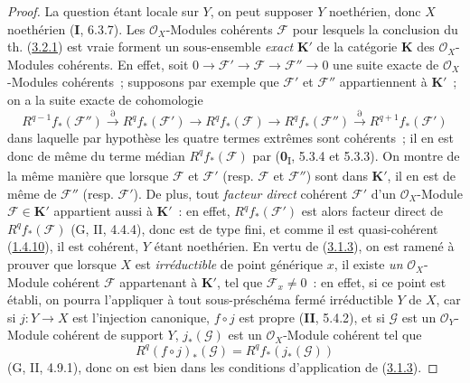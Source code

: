 \begin{proof}
La question étant locale sur $Y$, on peut supposer $Y$ noethérien, donc $X$
noethérien (\textbf{I}, 6.3.7). Les $\mathcal O_X$-Modules cohérents $\mathcal F$ pour
lesquels la conclusion du th. (\hyperref[III.3.2.1-fr]{3.2.1}) est vraie
forment un sous-ensemble \emph{exact} $\boldsymbol{K}'$ de la catégorie $\boldsymbol{K}$ des
$\mathcal O_X$-Modules cohérents.
En effet, soit
$0\to\mathcal F'\to\mathcal F\to\mathcal F''\to0$ une suite exacte de
$\mathcal O_X$-Modules cohérents~; supposons par exemple que $\mathcal F'$
et $\mathcal F''$ appartiennent à $\boldsymbol{K}'$~; on a la suite exacte de cohomologie
\[
R^{q-1}f_*(\mathcal F'')\xrightarrow{\partial}R^qf_*(\mathcal F')
\longrightarrow R^qf_*(\mathcal F)\longrightarrow R^qf_*(\mathcal F'')
\xrightarrow{\partial}R^{q+1}f_*(\mathcal F')
\]
dans laquelle par hypothèse les quatre termes extrêmes sont cohérents~; il
en est donc de même du terme médian $R^qf_*(\mathcal F)$ par
(\textbf{0}\textsubscript{I}, 5.3.4 et 5.3.3). On montre de la même manière que
lorsque $\mathcal F$ et $\mathcal F'$ (resp. $\mathcal F$ et
$\mathcal F''$) sont dans $\boldsymbol{K}'$, il en est de même de $\mathcal F''$ (resp.
$\mathcal F'$). De plus, tout \emph{facteur direct} cohérent $\mathcal F'$
d'un $\mathcal O_X$-Module $\mathcal F\in\boldsymbol{K}'$ appartient aussi à $\boldsymbol{K}'$~: en
effet, $R^qf_*(\mathcal F')$ est alors facteur direct de
$R^qf_*(\mathcal F)$ (G, II, 4.4.4), donc est de type fini, et comme il est
quasi-cohérent (\hyperref[III.1.4.10-fr]{1.4.10}), il est cohérent, $Y$
étant noethérien. En vertu de (\hyperref[III.3.1.3-fr]{3.1.3}), on est
ramené à prouver que lorsque $X$ est \emph{irréductible} de point générique
$x$, il existe \emph{un} $\mathcal O_X$-Module cohérent $\mathcal F$ appartenant à
$\boldsymbol{K}'$, tel que $\mathcal F_x\neq0$~: en effet, si ce point est établi, on
pourra l'appliquer à tout sous-préschéma fermé irréductible $Y$ de $X$, car
si $j:Y\to X$ est l'injection canonique, $f\circ j$ est propre (\textbf{II}, 5.4.2),
et si $\mathcal G$ est un $\mathcal O_Y$-Module cohérent de support $Y$,
$j_*(\mathcal G)$ est un $\mathcal O_X$-Module cohérent tel que
\[
R^q(f\circ j)_*(\mathcal G)=R^qf_*(j_*(\mathcal G))
\]
(G, II, 4.9.1), donc on est bien dans les conditions d'application de
(\hyperref[III.3.1.3-fr]{3.1.3}).


\end{proof}

